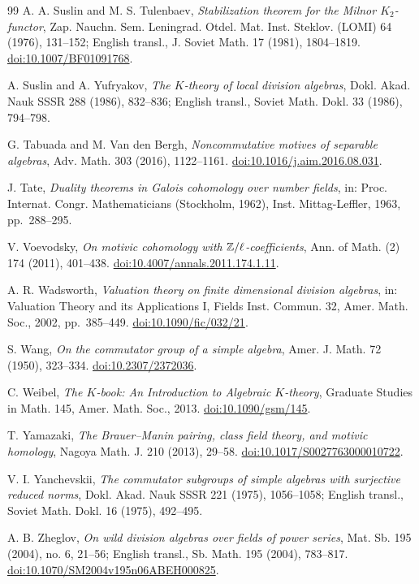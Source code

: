 \begin{thebibliography}{99}
 A. A. Suslin and M. S. Tulenbaev,
\emph{Stabilization theorem for the Milnor $K_2$-functor},
Zap. Nauchn. Sem. Leningrad. Otdel. Mat. Inst. Steklov. (LOMI) 64 (1976), 131--152;
English transl., J. Soviet Math. 17 (1981), 1804--1819.
\href{https://doi.org/10.1007/BF01091768}{doi:10.1007/BF01091768}.

 A. Suslin and A. Yufryakov,
\emph{The $K$-theory of local division algebras},
Dokl. Akad. Nauk SSSR 288 (1986), 832--836;
English transl., Soviet Math. Dokl. 33 (1986), 794--798.

 G. Tabuada and M. Van den Bergh,
\emph{Noncommutative motives of separable algebras},
Adv. Math. 303 (2016), 1122--1161.
\href{https://doi.org/10.1016/j.aim.2016.08.031}{doi:10.1016/j.aim.2016.08.031}.

 J. Tate,
\emph{Duality theorems in Galois cohomology over number fields},
in: Proc. Internat. Congr. Mathematicians (Stockholm, 1962), Inst. Mittag-Leffler, 1963, pp.~288--295.

 V. Voevodsky,
\emph{On motivic cohomology with $\mathbb Z/\ell$-coefficients},
Ann. of Math. (2) 174 (2011), 401--438.
\href{https://doi.org/10.4007/annals.2011.174.1.11}{doi:10.4007/annals.2011.174.1.11}.

 A. R. Wadsworth,
\emph{Valuation theory on finite dimensional division algebras},
in: Valuation Theory and its Applications I, Fields Inst. Commun. 32, Amer. Math. Soc., 2002, pp.~385--449.
\href{https://doi.org/10.1090/fic/032/21}{doi:10.1090/fic/032/21}.

 S. Wang,
\emph{On the commutator group of a simple algebra},
Amer. J. Math. 72 (1950), 323--334.
\href{https://doi.org/10.2307/2372036}{doi:10.2307/2372036}.

 C. Weibel,
\emph{The $K$-book: An Introduction to Algebraic $K$-theory},
Graduate Studies in Math. 145, Amer. Math. Soc., 2013.
\href{https://doi.org/10.1090/gsm/145}{doi:10.1090/gsm/145}.

 T. Yamazaki,
\emph{The Brauer--Manin pairing, class field theory, and motivic homology},
Nagoya Math. J. 210 (2013), 29--58.
\href{https://doi.org/10.1017/S0027763000010722}{doi:10.1017/S0027763000010722}.

 V. I. Yanchevskii,
\emph{The commutator subgroups of simple algebras with surjective reduced norms},
Dokl. Akad. Nauk SSSR 221 (1975), 1056--1058;
English transl., Soviet Math. Dokl. 16 (1975), 492--495.

 A. B. Zheglov,
\emph{On wild division algebras over fields of power series},
Mat. Sb. 195 (2004), no. 6, 21--56;
English transl., Sb. Math. 195 (2004), 783--817.
\href{https://doi.org/10.1070/SM2004v195n06ABEH000825}{doi:10.1070/SM2004v195n06ABEH000825}.

\end{thebibliography}

